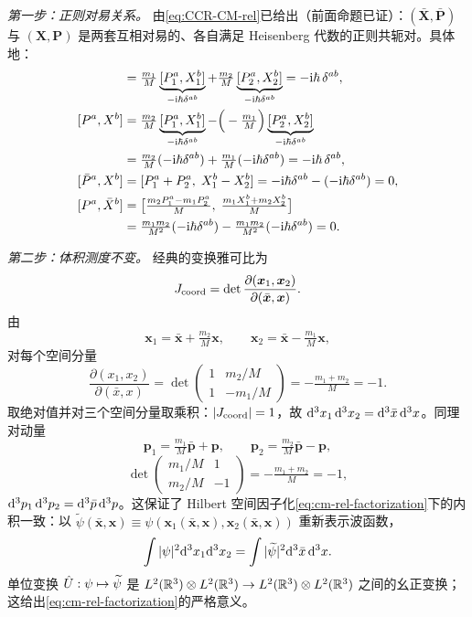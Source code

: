 \begin{proof*}
\textit{第一步：正则对易关系。} 由\eqref{eq:CCR-CM-rel}已给出（前面命题已证）：$(\bar{\bm{X}},\bar{\bm{P}})$ 与 $(\bm{X},\bm{P})$ 是两套互相对易的、各自满足 Heisenberg 代数的正则共轭对。具体地：
\begin{align}
  [\bar P^a,\bar X^b]
  &= \tfrac{m_1}{M}\underbrace{[P_1^a,X_1^b]}_{-\rmi\hbar\delta^{ab}}
   + \tfrac{m_2}{M}\underbrace{[P_2^a,X_2^b]}_{-\rmi\hbar\delta^{ab}}
   = -\rmi\hbar\,\delta^{ab}, \label{eq:2P-comm1}\\
  [P^a,X^b]
  &= \tfrac{m_2}{M}\underbrace{[P_1^a,X_1^b]}_{-\rmi\hbar\delta^{ab}}
    -\Big(-\tfrac{m_1}{M}\Big)\underbrace{[P_2^a,X_2^b]}_{-\rmi\hbar\delta^{ab}} \notag\\
  &= \tfrac{m_2}{M}(-\rmi\hbar\delta^{ab}) + \tfrac{m_1}{M}(-\rmi\hbar\delta^{ab})
   = -\rmi\hbar\,\delta^{ab}, \label{eq:2P-comm2}\\
  [\bar P^a,X^b]
  &= [P_1^a+P_2^a,\;X_1^b-X_2^b]
   = -\rmi\hbar\delta^{ab} - (-\rmi\hbar\delta^{ab}) = 0, \label{eq:2P-comm3}\\
  [P^a,\bar X^b]
  &= \big[\tfrac{m_2 P_1^a-m_1 P_2^a}{M},\;\tfrac{m_1 X_1^b+m_2 X_2^b}{M}\big] \notag\\
  &= \tfrac{m_1 m_2}{M^2}(-\rmi\hbar\delta^{ab})
   - \tfrac{m_1 m_2}{M^2}(-\rmi\hbar\delta^{ab}) = 0. \label{eq:2P-comm4}
\end{align}

\textit{第二步：体积测度不变。} 经典的变换雅可比为
\[
  J_{\rm coord}=\det\frac{\partial(\bm{x}_1,\bm{x}_2)}{\partial(\bar{\bm{x}},\bm{x})}.
\]
由
\[
  \bm{x}_1 = \bar{\bm{x}} + \tfrac{m_2}{M}\bm{x},\qquad
  \bm{x}_2 = \bar{\bm{x}} - \tfrac{m_1}{M}\bm{x},
\]
对每个空间分量
\[
  \frac{\partial(x_1,x_2)}{\partial(\bar x,x)}
  = \det\begin{pmatrix} 1 & m_2/M \\ 1 & -m_1/M \end{pmatrix}
  = -\tfrac{m_1+m_2}{M} = -1.
\]
取绝对值并对三个空间分量取乘积：$|J_{\rm coord}|=1$，故 $\mathrm{d}^3 x_1\,\mathrm{d}^3 x_2=\mathrm{d}^3\bar{x}\,\mathrm{d}^3 x$。同理对动量
\[
  \bm{p}_1 = \tfrac{m_1}{M}\bar{\bm{p}}+\bm{p},\qquad
  \bm{p}_2 = \tfrac{m_2}{M}\bar{\bm{p}}-\bm{p},
\]
\[
  \det\begin{pmatrix} m_1/M & 1 \\ m_2/M & -1 \end{pmatrix} = -\tfrac{m_1+m_2}{M} = -1,
\]
$\mathrm{d}^3 p_1\,\mathrm{d}^3 p_2=\mathrm{d}^3\bar{p}\,\mathrm{d}^3 p$。这保证了 Hilbert 空间因子化\eqref{eq:cm-rel-factorization}下的内积一致：以 $\widetilde{\psi}(\bar{\bm{x}},\bm{x})\equiv\psi(\bm{x}_1(\bar{\bm{x}},\bm{x}),\bm{x}_2(\bar{\bm{x}},\bm{x}))$ 重新表示波函数，
\[
  \int|\psi|^2\mathrm{d}^3 x_1\mathrm{d}^3 x_2 = \int|\widetilde{\psi}|^2\mathrm{d}^3\bar{x}\,\mathrm{d}^3 x.
\]
单位变换 $\hat{U}:\psi\mapsto\widetilde\psi$ 是 $L^2(\mathbb{R}^3)\otimes L^2(\mathbb{R}^3)\to L^2(\mathbb{R}^3)\otimes L^2(\mathbb{R}^3)$ 之间的幺正变换；这给出\eqref{eq:cm-rel-factorization}的严格意义。


\end{proof*}
